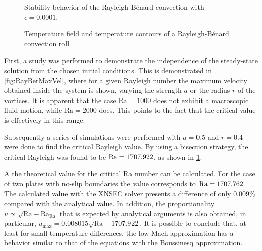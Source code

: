 \begin{figure}[bt]
	\centering
	\caption{Stability behavior of the Rayleigh-Bénard convection with $\epsilon = 0.0001$.} \label{fig:ReyBerCritRa}
\end{figure}
\begin{figure}[h]
	\centering
	\pgfplotsset{width=0.31\textwidth, compat=1.3}
	\par\bigskip
	\caption{Temperature field and temperature contours of a Rayleigh-Bénard convection roll} \label{fig:RayBenTemperatureField}
\end{figure}
First, a study was performed to demonstrate the independence of the steady-state solution from the chosen initial conditions. This is demonstrated in \cref{fig:RayBerMaxVel}, where for a given Rayleigh number the maximum velocity obtained inside the system is shown, varying the strength $a$ or the radius $r$ of the vortices. It is apparent that the case $\text{Ra} = 1000$ does not exhibit a macroscopic fluid motion, while $\text{Ra} = 2000$ does. This points to the fact that the critical value is effectively in this range. 

Subsequently a series of simulations were performed with $a = 0.5$ and $r = 0.4$ were done to find the critical Rayleigh value. By using a bisection strategy, the critical Rayleigh was found to be $\text{Ra} = 1707.922$, as shown in \cref{fig:ReyBerCritRa}. 

A the theoretical value  for the critical Ra number can be calculated. For the case of two plates with no-slip boundaries the value corresponds to $\text{Ra} = 1707.762$ \parencite{shishkinaRayleighBenardConvectionContainer2021}. The calculated value with the XNSEC solver presents a difference of only $0.009\%$ compared with the analytical value. In addition, the proportionality  $u \propto \sqrt{\text{Ra}- \text{Ra}_\text{Ra}}$  that is expected by analytical arguments is also obtained, in particular, $u_{\text{max}}  = 0.008015\sqrt{\text{Ra} - 1707.922}$. It is possible to conclude that, at least for small temperature differences, the low-Mach approximation has a behavior similar to that of the equations with the Boussinesq approximation. 

